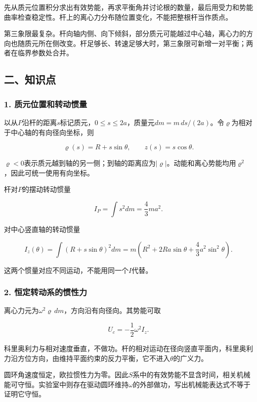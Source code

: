 \documentclass[12pt,a4paper,fontset=fandol]{ctexart}
\begin{document}
先从质元位置积分求出有效势能，再求平衡角并讨论根的数量，最后用受力和势能曲率检查稳定性。杆上的离心力分布随位置变化，不能把整根杆当作质点。

第三象限最复杂。杆向轴内侧、向下倾斜，部分质元可能越过中心轴，离心力的方向也随质元所在侧改变。杆足够长、转速足够大时，第三象限可新增一对平衡；两者在临界参数处合并。

\subsection{二、知识点}\label{ux4e8cux77e5ux8bc6ux70b9-3}

\subsubsection{1.
质元位置和转动惯量}\label{ux8d28ux5143ux4f4dux7f6eux548cux8f6cux52a8ux60efux91cf}

以从\(P\)沿杆的距离\(s\)标记质元，\(0\leq s\leq2a\)，质量元\(dm=m\,ds/(2a)\)。令\(\varrho\)为相对于中心轴的有向径向坐标，则

\[
\varrho(s)=R+s\sin\theta,\qquad z(s)=s\cos\theta.
\]

\(\varrho<0\)表示质元越到轴的另一侧；到轴的距离应为\(|\varrho|\)。动能和离心势能均用\(\varrho^2\)，因此可统一使用有向坐标。

杆对\(P\)的摆动转动惯量

\[
I_P=\int s^2dm=\frac43ma^2.
\]

对中心竖直轴的转动惯量

\[
I_z(\theta)=\int(R+s\sin\theta)^2dm
=m\left(R^2+2Ra\sin\theta+\frac43a^2\sin^2\theta\right).
\]

这两个惯量对应不同运动，不能用同一个\(I\)代替。

\subsubsection{2.
恒定转动系的惯性力}\label{ux6052ux5b9aux8f6cux52a8ux7cfbux7684ux60efux6027ux529b}

离心力元为\(\omega^2\varrho\,dm\)，方向沿有向径向。其势能可取

\[
U_c=-\frac12\omega^2 I_z.
\]

科里奥利力与相对速度垂直，不做功。杆的相对运动在径向竖直平面内，科里奥利力沿方位方向，由维持平面约束的反力平衡，它不进入\(\theta\)的广义力。

圆环角速度恒定，欧拉惯性力为零。因此\(S\)系中的有效势能不显含时间，相关机械能可守恒。实验室中则存在驱动圆环维持\(\omega\)的外部做功，写出机械能表达式不等于证明它守恒。
\end{document}
